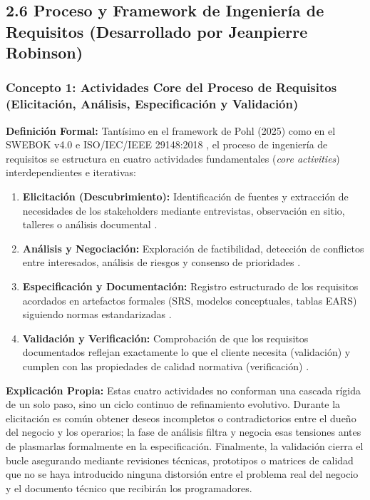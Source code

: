 \subsection{2.6 Proceso y Framework de Ingeniería de Requisitos (Desarrollado por Jeanpierre Robinson)}

\subsubsection{Concepto 1: Actividades Core del Proceso de Requisitos (Elicitación, Análisis, Especificación y Validación)}
\textbf{Definición Formal:} Tantísimo en el framework de Pohl (2025) \cite{pohl2025} como en el SWEBOK v4.0 \cite{swebok2024} e ISO/IEC/IEEE 29148:2018 \cite{ieee29148}, el proceso de ingeniería de requisitos se estructura en cuatro actividades fundamentales (\textit{core activities}) interdependientes e iterativas:
\begin{enumerate}
    \item \textbf{Elicitación (Descubrimiento):} Identificación de fuentes y extracción de necesidades de los stakeholders mediante entrevistas, observación en sitio, talleres o análisis documental \cite{pohl2025, wiegers2013}.
    \item \textbf{Análisis y Negociación:} Exploración de factibilidad, detección de conflictos entre interesados, análisis de riesgos y consenso de prioridades \cite{swebok2024, ireb2023}.
    \item \textbf{Especificación y Documentación:} Registro estructurado de los requisitos acordados en artefactos formales (SRS, modelos conceptuales, tablas EARS) siguiendo normas estandarizadas \cite{ieee29148, mavin2009ears}.
    \item \textbf{Validación y Verificación:} Comprobación de que los requisitos documentados reflejan exactamente lo que el cliente necesita (validación) y cumplen con las propiedades de calidad normativa (verificación) \cite{ieee29148, pohl2025}.
\end{enumerate}

\textbf{Explicación Propia:} Estas cuatro actividades no conforman una cascada rígida de un solo paso, sino un ciclo continuo de refinamiento evolutivo. Durante la elicitación es común obtener deseos incompletos o contradictorios entre el dueño del negocio y los operarios; la fase de análisis filtra y negocia esas tensiones antes de plasmarlas formalmente en la especificación. Finalmente, la validación cierra el bucle asegurando mediante revisiones técnicas, prototipos o matrices de calidad que no se haya introducido ninguna distorsión entre el problema real del negocio y el documento técnico que recibirán los programadores.


